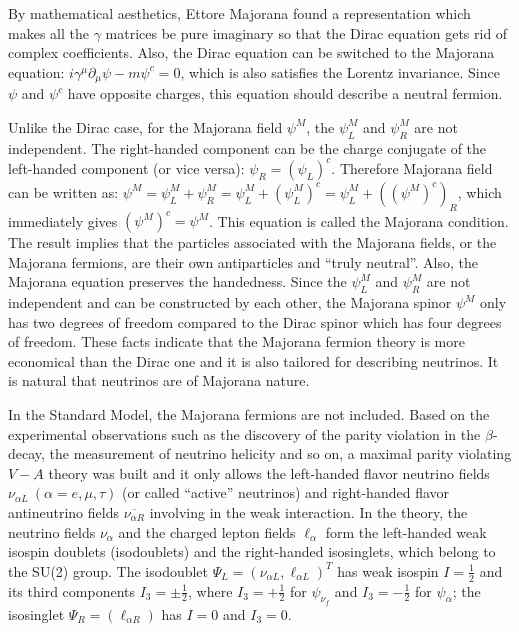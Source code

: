 By mathematical aesthetics, Ettore Majorana found a representation which makes all the $\gamma$ matrices be pure imaginary so that the Dirac equation gets rid of complex coefficients\cite{majorana2006symmetric}. Also, the Dirac equation can be switched to the Majorana equation: $i\gamma^\mu\partial_\mu\psi-m\psi^c=0$, which is also satisfies the Lorentz invariance\cite{zee2010quantum}. Since $\psi$ and $\psi^c$ have opposite charges, this equation should describe a neutral fermion\cite{zee2010quantum}. 

Unlike the Dirac case, for the Majorana field $\psi^M$, the $\psi^M_L$ and $\psi^M_R$ are not independent. The right-handed component can be the charge conjugate of the left-handed component (or vice versa): $\psi_R=(\psi_L)^c$\cite{akhmedov2014majorana}. Therefore Majorana field can be written as: $\psi^M=\psi_L^M+\psi_R^M=\psi^M_L+(\psi^M_L)^c=\psi^M_L+((\psi^M)^c)_R$, which immediately gives $(\psi^M)^c=\psi^M$. This equation is called the Majorana condition. The result implies that the particles associated with the Majorana fields, or the Majorana fermions, are their own antiparticles and ``truly neutral''\cite{akhmedov2014majorana}. Also, the Majorana equation preserves the handedness\cite{zee2010quantum}. Since the $\psi^M_L$ and $\psi^M_R$ are not independent and can be constructed by each other, the Majorana spinor $\psi^M$ only has two degrees of freedom compared to the Dirac spinor which has four degrees of freedom. These facts indicate that the Majorana fermion theory is more economical than the Dirac one and it is also tailored for describing neutrinos. It is natural that neutrinos are of Majorana nature.

In the Standard Model, the Majorana fermions are not included. Based on the experimental observations such as the discovery of the parity violation in the $\beta$-decay\cite{wu1957experimental}, the measurement of neutrino helicity\cite{goldhaber1958helicity} and so on, a maximal parity violating $V-A$ theory was built and it only allows the left-handed flavor neutrino fields $\nu_{\alpha L}~(\alpha=e,\mu,\tau)$ (or called ``active'' neutrinos) and right-handed flavor antineutrino fields $\overline{\nu_{\alpha R}}$ involving in the weak interaction. In the theory, the neutrino fields $\nu_\alpha$ and the charged lepton fields $\ell_\alpha$ form the left-handed weak isospin doublets (isodoublets) and the right-handed isosinglets, which belong to the SU(2) group. The isodoublet $\Psi_L = (\nu_{\alpha L}, \ell_{\alpha L})^T$ has weak isospin $I=\frac{1}{2}$ and its third components $I_3=\pm \frac{1}{2}$, where $I_3=+\frac{1}{2}$ for $\psi_{\nu_f}$ and $I_3=-\frac{1}{2}$ for $\psi_\alpha$; the isosinglet $\Psi_R = (\ell_{\alpha R})$ has $I=0$ and $I_3=0$\cite{aitchison2012gauge, greiner2012theoretical}.

